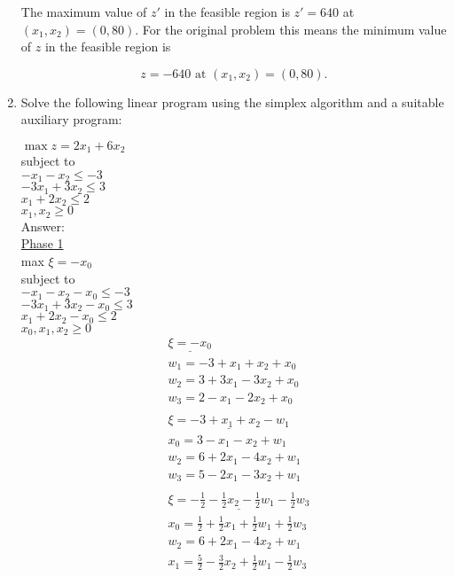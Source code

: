 \documentclass{article}
\begin{document}
\begin{enumerate}
The maximum value of $z'$ in the feasible region is $z' = 640$ at $(x_1,x_2) = (0, 80)$. For the original problem this means the minimum value of $z$ in the feasible region is

$$
\boxed{z = -640 \text{ at } (x_1, x_2) = (0,80).}
$$

\newpage
\item

Solve the following linear program using the simplex algorithm and a suitable auxiliary program:

$\max z = 2x_1 + 6x_2$\\
subject to\\
$-x_1 - x_2 \leq -3$\\
$-3x_1 + 3x_2 \leq 3$\\
$x_1 + 2x_2 \leq 2$ \\
$x_1, x_2 \geq 0$\\

Answer: \\

\underline{Phase 1}\\
max $\xi = -x_0$\\
subject to\\
$-x_1 - x_2 -x_0\leq -3$\\
$-3x_1 + 3x_2 - x_0 \leq 3$\\
$x_1 + 2x_2 -x_0 \leq 2$ \\
$x_0, x_1, x_2\geq 0$\\

\begin{align*}
&\underline{\xi = -x_0} \\
&w_1 = -3 + x_1 + x_2 + x_0 \\
&w_2 = 3 + 3x_1 - 3x_2 + x_0 \\
&w_3 = 2 - x_1 - 2x_2 + x_0 \\
&\\
&\underline{\xi = -3 +x_1 + x_2 - w_1} \\
&x_0 = 3 - x_1 - x_2 + w_1 \\
&w_2 = 6 + 2x_1 - 4x_2 + w_1 \\
&w_3 = 5 -2x_1 - 3x_2 + w_1 \\
&\\
&\underline{\xi = -\frac{1}{2} - \frac{1}{2}x_2 - \frac{1}{2}w_1 - \frac{1}{2}w_3} \\
&x_0 = \frac{1}{2} +  \frac{1}{2}x_1 + \frac{1}{2}w_1 + \frac{1}{2}w_3\\
&w_2 = 6 + 2x_1 - 4x_2 + w_1 \\
&x_1 = \frac{5}{2} - \frac{3}{2} x_2 + \frac{1}{2}w_1 - \frac{1}{2}w_3 \\
\end{align*}


\end{enumerate}
\end{document}
